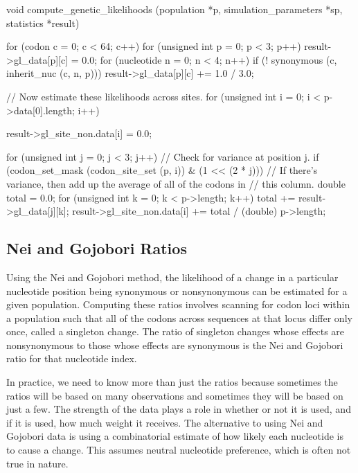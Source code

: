 \documentclass{article}
\begin{document}
\begin{ccode}
void compute_genetic_likelihoods (population *p, simulation_parameters *sp, statistics *result) {
  for (codon c = 0; c < 64; c++)
    for (unsigned int p = 0; p < 3; p++) {
      result->gl_data[p][c] = 0.0;
      for (nucleotide n = 0; n < 4; n++)
	if (! synonymous (c, inherit_nuc (c, n, p)))
	  result->gl_data[p][c] += 1.0 / 3.0;
    }

  // Now estimate these likelihoods across sites.
  for (unsigned int i = 0; i < p->data[0].length; i++) {
    result->gl_site_non.data[i] = 0.0;

    for (unsigned int j = 0; j < 3; j++)
      // Check for variance at position j.
      if (codon_set_mask (codon_site_set (p, i)) & (1 << (2 * j))) {
	// If there's variance, then add up the average of all of the codons in
	// this column.
	double total = 0.0;
	for (unsigned int k = 0; k < p->length; k++)
	  total += result->gl_data[j][k];
	result->gl_site_non.data[i] += total / (double) p->length;
      }
  }
}
\end{ccode}

    \subsection{Nei and Gojobori Ratios}
      \label{sec:nei-gojobori}

      Using the Nei and Gojobori method, the likelihood of a change in a
      particular nucleotide position being synonymous or nonsynonymous can be
      estimated for a given population. Computing these ratios involves scanning
      for codon loci within a population such that all of the codons across
      sequences at that locus differ only once, called a singleton change. The
      ratio of singleton changes whose effects are nonsynonymous to those whose
      effects are synonymous is the Nei and Gojobori ratio for that nucleotide
      index.

      In practice, we need to know more than just the ratios because sometimes
      the ratios will be based on many observations and sometimes they will be
      based on just a few. The strength of the data plays a role in whether or
      not it is used, and if it is used, how much weight it receives. The
      alternative to using Nei and Gojobori data is using a combinatorial
      estimate of how likely each nucleotide is to cause a change. This assumes
      neutral nucleotide preference, which is often not true in nature.
\end{document}
